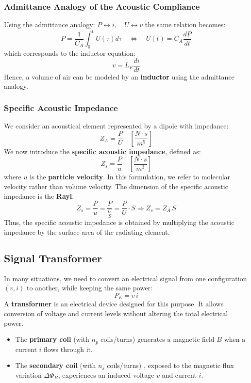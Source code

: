 \subsubsection{Admittance Analogy of the Acoustic Compliance}

Using the admittance analogy: $ P \leftrightarrow i,\quad U \leftrightarrow v $ the same relation becomes:
\[
P = \frac{1}{C_A} \int_0^t U(\tau) d\tau \quad \Leftrightarrow \quad U(t) = C_A \frac{dP}{dt}
\]
which corresponds to the inductor equation:
\[
v = L_E \frac{di}{dt}
\]
Hence, a volume of air can be modeled by an \textbf{inductor} using the admittance analogy.



\subsubsection{Specific Acoustic Impedance}

We consider an acoustical element represented by a dipole with impedance:
\[
Z_A = \frac{P}{U} \quad \left[ \frac{N \cdot s}{m^5} \right]
\]
We now introduce the \textbf{specific acoustic impedance}, defined as:
\[
Z_s = \frac{P}{u} \quad \left[ \frac{N \cdot s}{m^3} \right]
\]
where \( u \) is the \textbf{particle velocity}.  
In this formulation, we refer to molecular velocity rather than volume velocity. The dimension of the specific acoustic impedance is the \textbf{Rayl}.
\[
Z_s = \frac{P}{u} = \frac{P}{\frac{U}{S}} = \frac{P}{U} \cdot S \Rightarrow Z_s = Z_A \, S
\]
Thus, the specific acoustic impedance is obtained by multiplying the acoustic impedance by the surface area of the radiating element.



\subsection{Signal Transformer}

In many situations, we need to convert an electrical signal from one configuration \((v, i)\) to another, while keeping the same power:
\[
P_E = v \, i
\]
A \textbf{transformer} is an electrical device designed for this purpose. It allows conversion of voltage and current levels without altering the total electrical power.

\begin{itemize}
    \item The \textbf{primary coil} (with $n_p$ coils/turns) generates a magnetic field \( B \) when a current \( i \) flows through it.
    \item The \textbf{secondary coil} (with $n_s$ coils/turns) , exposed to the magnetic flux variation \( \Delta \Phi_B \), experiences an induced voltage \( v \) and current \( i \).
\end{itemize}

